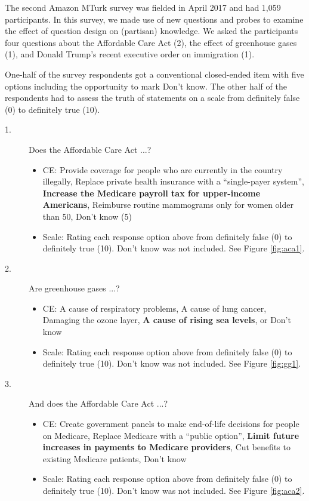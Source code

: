 The second Amazon MTurk survey was fielded in April 2017 and had 1,059 participants. In this survey, we made use of new questions and probes to examine the effect of question design on (partisan) knowledge. We asked the participants four questions about the Affordable Care Act (2), the effect of greenhouse gases (1), and Donald Trump's recent executive order on immigration (1).

One-half of the survey respondents got a conventional closed-ended item with five options including the opportunity to mark Don’t know. The other half of the respondents had to assess the truth of statements on a scale from definitely false (0) to definitely true (10).

\begin{description}
\item[1.] Does the Affordable Care Act ...?
  \begin{itemize}
    \item  CE: Provide coverage for people who are currently in the country illegally, Replace private health insurance with a ``single-payer system'', \textbf{Increase the Medicare payroll tax for upper-income Americans}, Reimburse routine mammograms only for women older than 50, Don’t know (5)
    \item  Scale: Rating each response option above from definitely false (0) to definitely true (10). Don't know was not included. See Figure \ref{fig:aca1}.
    \end{itemize}
    \item[2.] Are greenhouse gases ...?
  \begin{itemize}
  \item CE: A cause of respiratory problems, A cause of lung cancer, Damaging the ozone layer, \textbf{A cause of rising sea levels}, or Don't know
  \item Scale: Rating each response option above from definitely false (0) to definitely true (10). Don't know was not included. See Figure \ref{fig:gg1}.
    \end{itemize}
  \item[3.] And does the Affordable Care Act ...?
    \begin{itemize}
  \item CE: Create government panels to make end-of-life decisions for people on Medicare, Replace Medicare with a ``public option'', \textbf{Limit future increases in payments to Medicare providers}, Cut benefits to existing Medicare patients, Don’t know
  \item Scale: Rating each response option above from definitely false (0) to definitely true (10). Don't know was not included. See Figure \ref{fig:aca2}.

\end{itemize}
\end{description}
